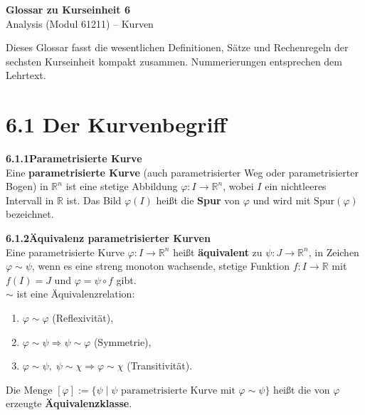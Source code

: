 \documentclass[a4paper,12pt]{article}
\newcommand{\gentry}[3]{%
  \noindent\textbf{#1\quad #2}\nopagebreak\\[0.2em]
  #3\par\smallskip
}
\begin{document}
\begin{center}
  {\LARGE\bfseries Glossar zu Kurseinheit 6}\\[0.5em]
  {\large Analysis (Modul 61211) -- Kurven}
\end{center}

\vspace{1em}

Dieses Glossar fasst die wesentlichen Definitionen, Sätze und Rechenregeln der
sechsten Kurseinheit kompakt zusammen. Nummerierungen entsprechen dem Lehrtext.

\section*{6.1 \quad Der Kurvenbegriff}

\gentry{6.1.1}{Parametrisierte Kurve}{%
  Eine \textbf{parametrisierte Kurve} (auch parametrisierter Weg oder parametrisierter
  Bogen) in $\mathbb{R}^n$ ist eine stetige Abbildung $\varphi : I \longrightarrow \mathbb{R}^n$,
  wobei $I$ ein nichtleeres Intervall in $\mathbb{R}$ ist. Das Bild $\varphi(I)$ heißt die
  \textbf{Spur} von $\varphi$ und wird mit $\mathrm{Spur}(\varphi)$ bezeichnet.
}

\gentry{6.1.2}{Äquivalenz parametrisierter Kurven}{%
  Eine parametrisierte Kurve $\varphi : I \longrightarrow \mathbb{R}^n$ heißt \textbf{äquivalent}
  zu $\psi : J \longrightarrow \mathbb{R}^n$, in Zeichen $\varphi \sim \psi$, wenn es eine
  streng monoton wachsende, stetige Funktion $f : I \longrightarrow \mathbb{R}$ mit
  $f(I) = J$ und $\varphi = \psi \circ f$ gibt.\\
  $\sim$ ist eine Äquivalenzrelation:
  \begin{enumerate}[label=(\roman*),topsep=2pt,itemsep=1pt]
    \item $\varphi \sim \varphi$ \quad (Reflexivität),
    \item $\varphi \sim \psi \Rightarrow \psi \sim \varphi$ \quad (Symmetrie),
    \item $\varphi \sim \psi,\; \psi \sim \chi \Rightarrow \varphi \sim \chi$ \quad (Transitivität).
  \end{enumerate}
  Die Menge $[\varphi] := \{\psi \mid \psi \text{ parametrisierte Kurve mit } \varphi \sim \psi\}$
  heißt die von $\varphi$ erzeugte \textbf{Äquivalenzklasse}.
}
\end{document}
